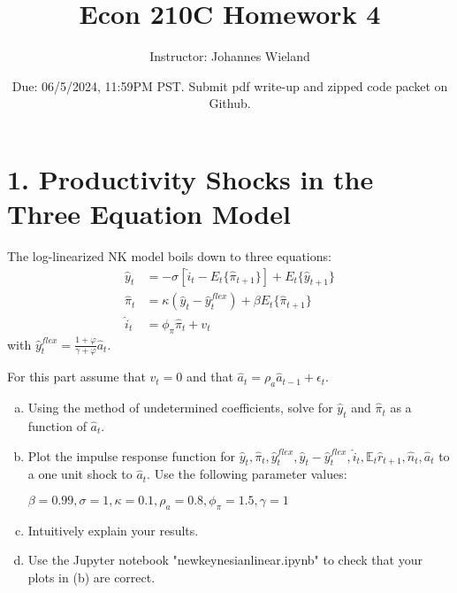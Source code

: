 \documentclass{article}
\newcommand{\E}{\mathbb{E}}
\newcommand{\1}{\mathbf{1}}
\begin{document}
\title{Econ 210C Homework 4}
\author{Instructor: Johannes Wieland}
\date{\color{red} Due: 06/5/2024, 11:59PM PST. Submit pdf write-up and zipped code packet on Github.}
\maketitle

\section*{1. Productivity Shocks in the Three Equation Model}
The log-linearized NK model boils down to three equations:
	\begin{align*}
		\hat{y}_t &=-\sigma[\hat{i}_t-E_t\{\hat{\pi}_{t+1}\}]+E_t\{\hat{y}_{t+1}\} \\
		\hat{\pi}_t&=\kappa (\hat{y}_t-\hat{y}_t^{flex}) +\beta E_t \{\hat{\pi}_{t+1}\} \\
		\hat{i}_t&=\phi_\pi\hat{\pi}_t+v_t 
	\end{align*}
with $\hat{y}_t^{flex}=\frac{1+\varphi}{\gamma+\varphi}\hat{a}_t$.
	
For this part assume that $v_t=0$ and that $\hat{a}_t = \rho_a \hat{a}_{t-1} + \epsilon_t$.

\begin{enumerate}[(a)]
	\item Using the method of undetermined coefficients, solve for $\hat{y}_t$ and $\hat{\pi}_t$ as a function of $\hat{a}_t$.
	\item Plot the impulse response function for $\hat{y}_t, \hat{\pi}_t,\hat{y}_t^{flex},\hat{y}_t-\hat{y}_t^{flex},\hat{i}_t,\E_t\hat{r}_{t+1},\hat{n}_{t},\hat{a}_t$ to a one unit shock to $\hat{a}_t$. Use the following parameter values:
	
	$\beta=0.99,\sigma=1,\kappa=0.1,\rho_a=0.8,\phi_\pi=1.5, \gamma=1$
	\item Intuitively explain your results.
	\item Use the Jupyter notebook "newkeynesianlinear.ipynb" to check that your plots in (b) are correct.
\end{enumerate}
\end{document}
